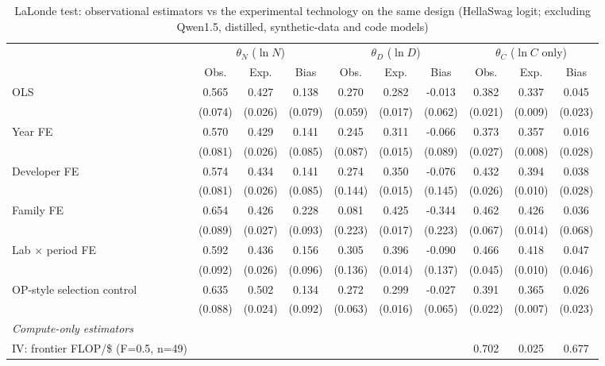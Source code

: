 \begin{table}[!htbp]
\centering
\scriptsize
\begin{threeparttable}
\caption{LaLonde test: observational estimators vs the experimental technology on the same design (HellaSwag logit; excluding Qwen1.5, distilled, synthetic-data and code models)}
\label{tab:table6_lalonde_clean}
\begin{tabular}{lccccccccc}
\toprule
\multicolumn{1}{c}{} & \multicolumn{3}{c}{$\theta_N$ ($\ln N$)} & \multicolumn{3}{c}{$\theta_D$ ($\ln D$)} & \multicolumn{3}{c}{$\theta_C$ ($\ln C$ only)} \\ \cmidrule(lr){2-4}\cmidrule(lr){5-7}\cmidrule(lr){8-10}
 & Obs. & Exp. & Bias & Obs. & Exp. & Bias & Obs. & Exp. & Bias \\
\midrule
OLS & 0.565 & 0.427 & 0.138 & 0.270 & 0.282 & -0.013 & 0.382 & 0.337 & 0.045 \\
 & (0.074) & (0.026) & (0.079) & (0.059) & (0.017) & (0.062) & (0.021) & (0.009) & (0.023) \\
Year FE & 0.570 & 0.429 & 0.141 & 0.245 & 0.311 & -0.066 & 0.373 & 0.357 & 0.016 \\
 & (0.081) & (0.026) & (0.085) & (0.087) & (0.015) & (0.089) & (0.027) & (0.008) & (0.028) \\
Developer FE & 0.574 & 0.434 & 0.141 & 0.274 & 0.350 & -0.076 & 0.432 & 0.394 & 0.038 \\
 & (0.081) & (0.026) & (0.085) & (0.144) & (0.015) & (0.145) & (0.026) & (0.010) & (0.028) \\
Family FE & 0.654 & 0.426 & 0.228 & 0.081 & 0.425 & -0.344 & 0.462 & 0.426 & 0.036 \\
 & (0.089) & (0.027) & (0.093) & (0.223) & (0.017) & (0.223) & (0.067) & (0.014) & (0.068) \\
Lab $\times$ period FE & 0.592 & 0.436 & 0.156 & 0.305 & 0.396 & -0.090 & 0.466 & 0.418 & 0.047 \\
 & (0.092) & (0.026) & (0.096) & (0.136) & (0.014) & (0.137) & (0.045) & (0.010) & (0.046) \\
OP-style selection control & 0.635 & 0.502 & 0.134 & 0.272 & 0.299 & -0.027 & 0.391 & 0.365 & 0.026 \\
 & (0.088) & (0.024) & (0.092) & (0.063) & (0.016) & (0.065) & (0.022) & (0.007) & (0.023) \\
\midrule
\multicolumn{10}{l}{\textit{Compute-only estimators}} \\
IV: frontier FLOP/\$ (F=0.5, n=49) &  &  &  &  &  &  & 0.702 & 0.025 & 0.677 \\

\end{tabular}
\end{threeparttable}
\end{table}
